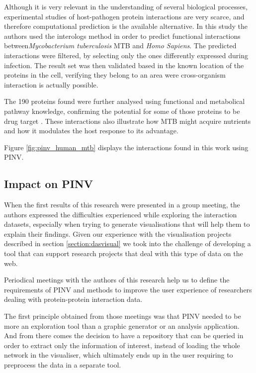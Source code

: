 Although it is very relevant in the understanding of several biological processes, experimental studies of host-pathogen protein interactions are very scarce, and therefore computational prediction is the available alternative. In this study the authors used the interologs method in order to predict functional interactions between\emph{Mycobacterium tuberculosis} MTB and \emph{Homo Sapiens}. The predicted interactions were filtered, by selecting only the ones differently expressed during infection. The result set was then validated based in the known location of the proteins in the cell, verifying they belong to an area were cross-organism interaction is actually possible. 

The 190 proteins found were further analysed using functional and metabolical pathway knowledge, confirming the potential for some of those proteins to be drug target \cite{RAP2013}. These interactions also illustrate how MTB might acquire nutrients and how it modulates the host response to its advantage.

Figure \ref{fig:pinv_human_mtb} displays the interactions found in this work using PINV.


\subsection{Impact on PINV}

When the first results of this research were presented in a group meeting, the authors expressed the difficulties experienced while exploring the interaction datasets, especially when trying to generate visualisations that will help them to explain their findings. Given our experience with the visualisation projects described in section \ref{section:dasvisual} we took into the challenge of developing a tool that can support research projects that deal with this type of data on the web.

Periodical meetings with the authors of this research help us to define the requirements of PINV and methods to improve the user experience of researchers dealing with protein-protein interaction data. 

The first principle obtained from those meetings was that PINV needed to be more an exploration tool than a graphic generator or an analysis application. And from there comes the decision to have a repository that can be queried in order to extract only the information of interest, instead of loading the whole network in the visualiser, which ultimately ends up in the user requiring to preprocess the data in a separate tool.

